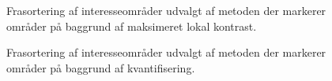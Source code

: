 \begin{figure}[htbp]
  \centering
  \begin{minipage}[b]{5 cm}
  \end{minipage}
  \begin{minipage}[b]{5 cm}
  \end{minipage}
  \caption{Frasortering af interesseområder udvalgt af metoden der markerer områder på baggrund af maksimeret lokal kontrast.}
   \label{fig:DetectCStretch-cleanup}
\end{figure}

\begin{figure}[htbp]
  \centering
  \begin{minipage}[b]{5 cm}
  \end{minipage}
  \begin{minipage}[b]{5 cm}
  \end{minipage}
  \caption{Frasortering af interesseområder udvalgt af metoden der markerer områder på baggrund af kvantifisering.}
   \label{fig:DetectQuant-cleanup}
\end{figure}


